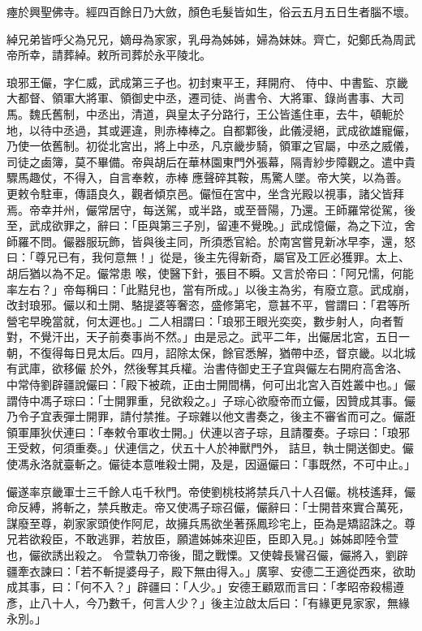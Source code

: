 \begin{pinyinscope}
 瘞於興聖佛寺。經四百餘日乃大斂，顏色毛髮皆如生，俗云五月五日生者腦不壞。



 綽兄弟皆呼父為兄兄，嫡母為家家，乳母為姊姊，婦為妹妹。齊亡，妃鄭氏為周武帝所幸，請葬綽。敕所司葬於永平陵北。



 琅邪王儼，字仁威，武成第三子也。初封東平王，拜開府、
 侍中、中書監、京畿大都督、領軍大將軍、領御史中丞，遷司徒、尚書令、大將軍、錄尚書事、大司馬。魏氏舊制，中丞出，清道，與皇太子分路行，王公皆遙住車，去牛，頓軛於地，以待中丞過，其或遲違，則赤棒棒之。自都鄴後，此儀浸絕，武成欲雄寵儼，乃使一依舊制。初從北宮出，將上中丞，凡京畿步騎，領軍之官屬，中丞之威儀，司徒之鹵簿，莫不畢備。帝與胡后在華林園東門外張幕，隔青紗步障觀之。遣中貴驟馬趣仗，不得入，自言奉敕，赤棒
 應聲碎其鞍，馬驚人墜。帝大笑，以為善。更敕令駐車，傳語良久，觀者傾京邑。儼恒在宮中，坐含光殿以視事，諸父皆拜焉。帝幸并州，儼常居守，每送駕，或半路，或至晉陽，乃還。王師羅常從駕，後至，武成欲罪之，辭曰：「臣與第三子別，留連不覺晚。」武成憶儼，為之下泣，舍師羅不問。儼器服玩飾，皆與後主同，所須悉官給。於南宮嘗見新冰早李，還，怒曰：「尊兄已有，我何意無！」從是，後主先得新奇，屬官及工匠必獲罪。太上、胡后猶以為不足。儼常患
 喉，使醫下針，張目不瞬。又言於帝曰：「阿兄懦，何能率左右？」帝每稱曰：「此黠兒也，當有所成。」以後主為劣，有廢立意。武成崩，改封琅邪。儼以和土開、駱提婆等奢恣，盛修第宅，意甚不平，嘗謂曰：「君等所營宅早晚當就，何太遲也。」二人相謂曰：「琅邪王眼光奕奕，數步射人，向者暫對，不覺汗出，天子前奏事尚不然。」由是忌之。武平二年，出儼居北宮，五日一朝，不復得每日見太后。四月，詔除太保，餘官悉解，猶帶中丞，督京畿。以北城有武庫，欲移儼
 於外，然後奪其兵權。治書侍御史王子宜與儼左右開府高舍洛、中常侍劉辟疆說儼曰：「殿下被疏，正由士開間構，何可出北宮入百姓叢中也。」儼謂侍中馮子琮曰：「士開罪重，兒欲殺之。」子琮心欲廢帝而立儼，因贊成其事。儼乃令子宜表彈士開罪，請付禁推。子琮雜以他文書奏之，後主不審省而可之。儼誑領軍厙狄伏連曰：「奉敕令軍收士開。」伏連以咨子琮，且請覆奏。子琮曰：「琅邪王受敕，何須重奏。」伏連信之，伏五十人於神獸門外，
 詰旦，執士開送御史。儼使馮永洛就臺斬之。儼徒本意唯殺士開，及是，因逼儼曰：「事既然，不可中止。」



 儼遂率京畿軍士三千餘人屯千秋門。帝使劉桃枝將禁兵八十人召儼。桃枝遙拜，儼命反縛，將斬之，禁兵散走。帝又使馮子琮召儼，儼辭曰：「士開昔來實合萬死，謀廢至尊，剃家家頭使作阿尼，故擁兵馬欲坐著孫鳳珍宅上，臣為是矯詔誅之。尊兄若欲殺臣，不敢逃罪，若放臣，願遣姊姊來迎臣，臣即入見。」姊姊即陸令萱也，儼欲誘出殺之。
 令萱執刀帝後，聞之戰慄。又使韓長鸞召儼，儼將入，劉辟疆牽衣諫曰：「若不斬提婆母子，殿下無由得入。」廣寧、安德二王適從西來，欲助成其事，曰：「何不入？」辟疆曰：「人少。」安德王顧眾而言曰：「孝昭帝殺楊遵彥，止八十人，今乃數千，何言人少？」後主泣啟太后曰：「有緣更見家家，無緣永別。」




\end{pinyinscope}
